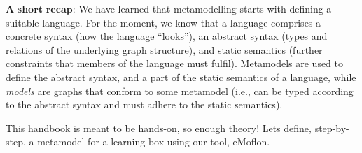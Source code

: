 $\textbf{A short recap:}$ We have learned that metamodelling starts with defining a suitable language. For the moment, we know that a language comprises a
concrete syntax (how the language ``looks''),  an abstract syntax (types and relations of the underlying graph structure), and static semantics (further
constraints that members of the language must fulfil). Metamodels are used to define the abstract syntax, and a part of the static semantics of a language,
while \emph{models} are graphs that conform to some metamodel (i.e., can be typed according to the abstract syntax and must adhere to the static
semantics).

This handbook is meant to be hands-on, so enough theory! Lets define, step-by-step, a metamodel for a learning box using our tool, eMoflon.


